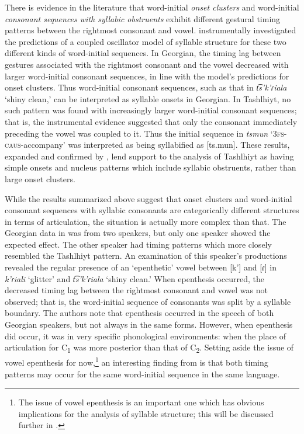   There is evidence in the literature that word-initial \textit{onset clusters} and word-initial \textit{consonant sequences with syllabic obstruents} exhibit different gestural timing patterns between the rightmost consonant and vowel. \citet{GoldsteinEtAl2007} instrumentally investigated the predictions of a coupled oscillator model of syllable structure for these two different kinds of word-initial sequences. In Georgian, the timing lag between gestures associated with the rightmost consonant and the vowel decreased with larger word-initial consonant sequences, in line with the model’s predictions for onset clusters. Thus word-initial consonant sequences, such as that in \textit{t͡s’k’ɾiala} ‘shiny clean,’ can be interpreted as syllable onsets in Georgian. In Tashlhiyt, no such pattern was found with increasingly larger word-initial consonant sequences; that is, the instrumental evidence suggested that only the consonant immediately preceding the vowel was coupled to it. Thus the initial sequence in \textit{tsmun} ‘\textsc{3fs}-\textsc{caus}-accompany’ was interpreted as being syllabified as [ts.mun]. These results, expanded and confirmed by \citet{HermesEtAl2011}, lend support to the analysis of Tashlhiyt as having simple onsets and nucleus patterns which include syllabic obstruents, rather than large onset clusters.

  While the results summarized above suggest that onset clusters and word-initial consonant sequences with syllabic consonants are categorically different structures in terms of articulation, the situation is actually more complex than that. The Georgian data in \citet{GoldsteinEtAl2007} was from two speakers, but only one speaker showed the expected effect. The other speaker had timing patterns which more closely resembled the Tashlhiyt pattern. An examination of this speaker’s productions revealed the regular presence of an ‘epenthetic’ vowel between [k’] and [ɾ] in \textit{k'ɾiali} ‘glitter’ and \textit{t͡s’k’ɾiala} ‘shiny clean.’ When epenthesis occurred, the decreased timing lag between the rightmost consonant and vowel was not observed; that is, the word-initial sequence of consonants was split by a syllable boundary. The authors note that epenthesis occurred in the speech of both Georgian speakers, but not always in the same forms. However, when epenthesis did occur, it was in very specific phonological environments: when the place of articulation for C\textsubscript{1} was more posterior than that of C\textsubscript{2}. Setting aside the issue of vowel epenthesis for now,\footnote{{The issue of vowel epenthesis is an important one which has obvious implications for the analysis of syllable structure; this will be discussed further in .}} an interesting finding from \citet{GoldsteinEtAl2007} is that both timing patterns may occur for the same word-initial sequence in the same language.

